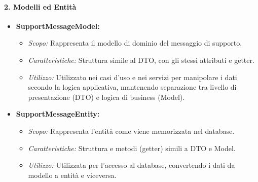     \paragraph{2. Modelli ed Entità}
    \begin{itemize}
        \item \textbf{SupportMessageModel:}
        \begin{itemize}
            \item \textit{Scopo:} Rappresenta il modello di dominio del messaggio di supporto.
            \item \textit{Caratteristiche:} Struttura simile al DTO, con gli stessi attributi e getter.
            \item \textit{Utilizzo:} Utilizzato nei casi d’uso e nei servizi per manipolare i dati secondo la logica applicativa, mantenendo separazione tra livello di presentazione (DTO) e logica di business (Model).
        \end{itemize}
        \item \textbf{SupportMessageEntity:}
        \begin{itemize}
            \item \textit{Scopo:} Rappresenta l’entità come viene memorizzata nel database.
            \item \textit{Caratteristiche:} Struttura e metodi (getter) simili a DTO e Model.
            \item \textit{Utilizzo:} Utilizzata per l’accesso al database, convertendo i dati da modello a entità e viceversa.
        \end{itemize}
    \end{itemize}

